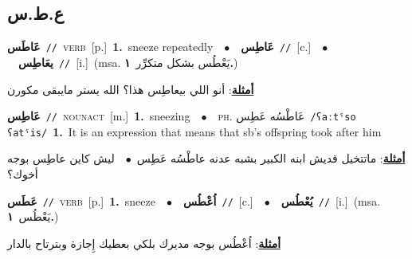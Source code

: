 \documentclass[10pt,a4paper,twoside]{article} %
\begin{document}
\begin{multicols}{2}
\vspace{-3mm}
\subsection*{\color{blue}\foreignlanguage{arabic}{ع.ط.س}\color{blue}{}} 

{\setlength\topsep{0pt}\textbf{\foreignlanguage{arabic}{عَاطَس}}\ {\color{gray}\texttt{//}\color{black}}\ \textsc{verb}\ [p.]\ \textbf{1.}~sneeze repeatedly\ \ $\bullet$\ \ \setlength\topsep{0pt}\textbf{\foreignlanguage{arabic}{عَاطِس}}\ {\color{gray}\texttt{//}\color{black}}\ [c.]\ \ $\bullet$\ \ \setlength\topsep{0pt}\textbf{\foreignlanguage{arabic}{يعَاطِس}}\ {\color{gray}\texttt{//}\color{black}}\ [i.]\ \color{gray}(msa. \foreignlanguage{arabic}{يَعْطُس بشكل متكرِّر}~\foreignlanguage{arabic}{\textbf{١.}})\color{black}\  \begin{flushright}\color{gray}\foreignlanguage{arabic}{\textbf{\underline{\foreignlanguage{arabic}{أمثلة}}}: أنو اللي بيعاطِس هذا؟ الله يستر مايبقى مكورن}\end{flushright}\color{black}} \vspace{2mm}

{\setlength\topsep{0pt}\textbf{\foreignlanguage{arabic}{عَاطِس}}\ {\color{gray}\texttt{//}\color{black}}\ \textsc{noun\textunderscore act}\ [m.]\ \textbf{1.}~sneezing\ \ $\bullet$\ \ \textsc{ph.} \color{gray} \foreignlanguage{arabic}{عَاطْسُه عَطِس}\color{black}\ {\color{gray}\texttt{/{\sffamily ʕaːtˤso ʕatˤis}/}\color{black}}\ \textbf{1.}~It is an expression that means that sb's offspring took after him\  \begin{flushright}\color{gray}\foreignlanguage{arabic}{\textbf{\underline{\foreignlanguage{arabic}{أمثلة}}}: ماتتخيل قديش ابنه الكبير بشبه عدنه عاطْسُه عَطِس\ $\bullet$\ \  ليش كاين عاطِس بوجه أخوك؟}\end{flushright}\color{black}} \vspace{2mm}

{\setlength\topsep{0pt}\textbf{\foreignlanguage{arabic}{عَطَس}}\ {\color{gray}\texttt{//}\color{black}}\ \textsc{verb}\ [p.]\ \textbf{1.}~sneeze\ \ $\bullet$\ \ \setlength\topsep{0pt}\textbf{\foreignlanguage{arabic}{اُعْطُس}}\ {\color{gray}\texttt{//}\color{black}}\ [c.]\ \ $\bullet$\ \ \setlength\topsep{0pt}\textbf{\foreignlanguage{arabic}{يُعْطُس}}\ {\color{gray}\texttt{//}\color{black}}\ [i.]\ \color{gray}(msa. \foreignlanguage{arabic}{يَعْطُس}~\foreignlanguage{arabic}{\textbf{١.}})\color{black}\  \begin{flushright}\color{gray}\foreignlanguage{arabic}{\textbf{\underline{\foreignlanguage{arabic}{أمثلة}}}: اُعْطُس بوجه مديرك بلكي بعطيك إِجازة وبترتاح بالدار}\end{flushright}\color{black}} \vspace{2mm}


\end{multicols}
\end{document}
